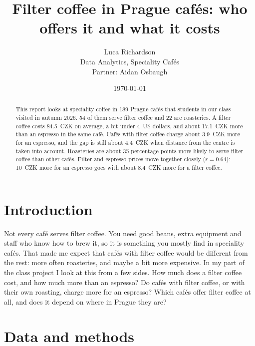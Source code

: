 \documentclass[11pt,a4paper]{article}
\title{\textbf{Filter coffee in Prague caf\'es: who offers it and what it costs}}
\author{Luca Richardson\\[0.3ex]\small Data Analytics, Speciality Caf\'es\\[0.3ex]\small Partner: Aidan Osbaugh}
\date{\today}
\begin{document}
\maketitle

\begin{abstract}
\noindent This report looks at speciality coffee in 189 Prague caf\'es that students in our class visited in autumn 2026. 54 of them serve filter coffee and 22 are roasteries. A filter coffee costs 84.5~CZK on average, a bit under 4~US dollars, and about 17.1~CZK more than an espresso in the same caf\'e. Caf\'es with filter coffee charge about 3.9~CZK more for an espresso, and the gap is still about 4.4~CZK when distance from the centre is taken into account. Roasteries are about 35 percentage points more likely to serve filter coffee than other caf\'es. Filter and espresso prices move together closely ($r=0.64$): 10~CZK more for an espresso goes with about 8.4~CZK more for a filter coffee.
\end{abstract}

\section{Introduction}
Not every caf\'e serves filter coffee. You need good beans, extra equipment and staff who know how to brew it, so it is something you mostly find in speciality caf\'es. That made me expect that caf\'es with filter coffee would be different from the rest: more often roasteries, and maybe a bit more expensive. In my part of the class project I look at this from a few sides. How much does a filter coffee cost, and how much more than an espresso? Do caf\'es with filter coffee, or with their own roasting, charge more for an espresso? Which caf\'es offer filter coffee at all, and does it depend on where in Prague they are?

\section{Data and methods}
\end{document}
